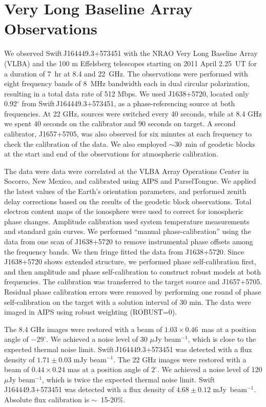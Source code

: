 \section{Very Long Baseline Array Observations}
\label{sec:vlba}

We observed Swift\,J164449.3+573451 with the NRAO Very Long Baseline
Array (VLBA) and the 100 m Effelsberg telescopes starting on 2011
April 2.25~UT for a duration of 7~hr at 8.4 and 22~GHz.  The
observations were performed with eight frequency bands of 8~MHz
bandwidth each in dual circular polarization, resulting in a total
data rate of 512 Mbps. We used J1638+5720, located only 0.92$^\circ$
from Swift\,J164449.3+573451, as a phase-referencing source at both
frequencies.  At 22 GHz, sources were switched every 40 seconds, while
at 8.4 GHz we spent 40 seconds on the calibrator and 90 seconds on
target.  A second calibrator, J1657+5705, was also observed for six
minutes at each frequency to check the calibration of the data.  We
also employed\cite{brf05,rmb+09} $\sim 30$~min of geodetic blocks at
the start and end of the observations for atmospheric calibration.  

The data were data were correlated at the VLBA Array Operations Center
in Socorro, New Mexico, and calibrated\cite{kvr+06} using AIPS and
ParselTongue.  We applied the latest values of the Earth's orientation
parameters, and performed zenith delay corrections based on the
results of the geodetic block observations.  Total electron content
maps of the ionosphere were used to correct for ionospheric phase
changes.  Amplitude calibration used system temperature measurements
and standard gain curves.  We performed ``manual phase-calibration''
using the data from one scan of J1638+5720 to remove instrumental
phase offsets among the frequency bands.  We then fringe fitted the
data from J1638+5720.  Since J1638+5720 shows extended structure, we
performed phase self-calibration first, and then amplitude and phase
self-calibration to construct robust models at both frequencies.  The
calibration was transferred to the target source and J1657+5705.
Residual phase calibration errors were removed by performing one round
of phase self-calibration on the target with a solution interval of 30
min. The data were imaged in AIPS using robust weighting (ROBUST=0).

The 8.4 GHz images were restored with a beam of $1.03\times 0.46$~mas
at a position angle of $-29^\circ$.  We achieved a noise level of 30
$\mu$Jy beam$^{-1}$, which is close to the expected thermal noise
limit.  Swift\,J164449.3+573451 was detected with a flux density of
$1.71\pm 0.03$ mJy beam$^{-1}$.  The 22 GHz images were restored with
a beam of $0.44\times 0.24$ mas at a position angle of $2^\circ$.  We
achieved a noise level of 120 $\mu$Jy beam$^{-1}$, which is twice the
expected thermal noise limit.  Swift\,J164449.3+573451 was detected
with a flux density of $4.68\pm 0.12$ mJy~beam$^{-1}$.
Absolute flux calibration is $\sim$~15-20$\%$.

